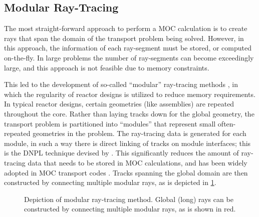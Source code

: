 {{      \subsection{Modular Ray-Tracing}{\label{ssec:RT:Modular Ray-Tracing}
        The most straight-forward approach to perform a \ac{MOC} calculation is to create rays that span the domain of the transport problem being solved.
        However, in this approach, the information of each ray-segment must be stored, or computed on-the-fly.
        In large problems the number of ray-segments can become exceedingly large, and this approach is not feasible due to memory constraints.

        This led to the development of so-called ``modular'' ray-tracing methods \cite{Filippone1980,Saji2000,Wu2003,Kochunas2013}, in which the regularity of reactor designs is utilized to reduce memory requirements.
        In typical reactor designs, certain geometries (like assemblies) are repeated throughout the core.
        Rather than laying tracks down for the global geometry, the transport problem is partitioned into ``modules'' that represent small often-repeated geometries in the problem.
        The ray-tracing data is generated for each module, in such a way there is direct linking of tracks on module interfaces; this is the \ac{DNPL} technique devised by \citet{Saji2000}.
        This significantly reduces the amount of ray-tracing data that needs to be stored in \ac{MOC} calculations, and has been widely adopted in \ac{MOC} transport codes \cite{Hong1998,Jung2009,Tang2009,DeCART,APOLLO3,MPACT2016,Hebert2017a}.
        Tracks spanning the global domain are then constructed by connecting multiple modular rays, as is depicted in \cref{fig:MRT:Modular Ray Tracing}.

        \begin{figure}[h]
            \centering
            \def\svgwidth{0.4\linewidth}
            
            \caption{Depiction of modular ray-tracing method. Global (long) rays can be constructed by connecting multiple modular rays, as is shown in red.}
            \label{fig:MRT:Modular Ray Tracing}
        \end{figure}

}}}

